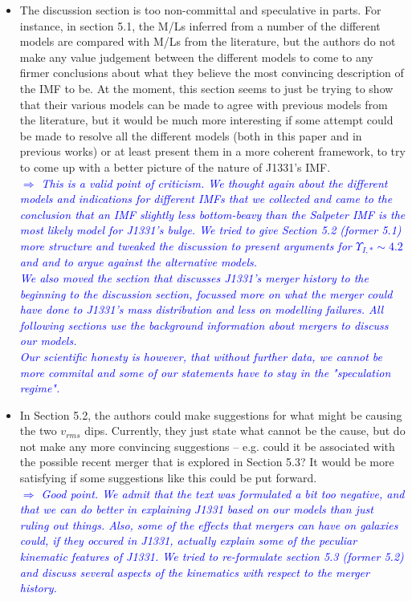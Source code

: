 \documentclass[10pt,a4paper]{article}
\newcommand{\Comment}[1]{\textsl{\textcolor{Blue}{$\Longrightarrow$ {#1}}}}
\begin{document}
\begin{itemize}
\item The discussion section is too non-committal and speculative in parts. For instance,
in section 5.1, the M/Ls inferred from a number of the different models are compared
with M/Ls from the literature, but the authors do not make any value judgement
between the different models to come to any firmer conclusions about what they
believe the most convincing description of the IMF to be. At the moment, this
section seems to just be trying to show that their various models can be made to
agree with previous models from the literature, but it would be much more
interesting if some attempt could be made to resolve all the different models (both
in this paper and in previous works) or at least present them in a more coherent
framework, to try to come up with a better picture of the nature of J1331's IMF. \\\Comment{This is a valid point of criticism. We thought again about the different models and indications for different IMFs that we collected and came to the conclusion that an IMF slightly less bottom-beavy than the Salpeter IMF is the most likely model for J1331's bulge. We tried to give Section 5.2 (former 5.1) more structure and tweaked the discussion to present arguments for $\Upsilon_{I,*} \sim 4.2$ and and to argue against the alternative models.\\We also moved the section that discusses J1331's merger history to the beginning to the discussion section, focussed more on what the merger could have done to J1331's mass distribution and less on modelling failures. All following sections use the background information about mergers to discuss our models.\\Our scientific honesty is however, that without further data, we cannot be more commital and some of our statements have to stay in the "speculation regime".}

\item In Section 5.2, the authors could make suggestions for what might be causing the two
$v_{rms}$ dips. Currently, they just state what cannot be the cause, but do not make any
more convincing suggestions – e.g. could it be associated with the possible recent
merger that is explored in Section 5.3? It would be more satisfying if some
suggestions like this could be put forward. \\\Comment{Good point. We admit that the text was formulated a bit too negative, and that we can do better in explaining J1331 based on our models than just ruling out things. Also, some of the effects that mergers can have on galaxies \emph{could}, if they occured in J1331, actually explain some of the peculiar kinematic features of J1331. We tried to re-formulate section 5.3 (former 5.2) and discuss several aspects of the kinematics with respect to the merger history.}


\end{itemize}
\end{document}
